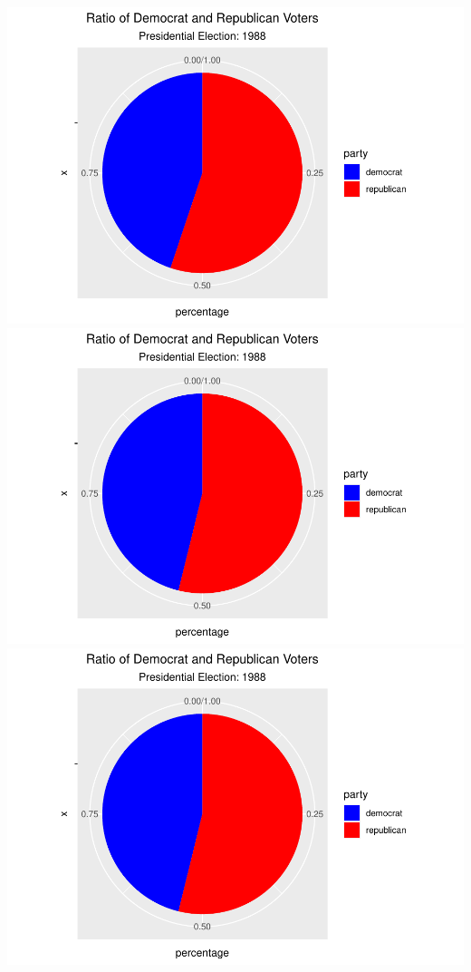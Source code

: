 \documentclass[
]{article}
\begin{document}
\includegraphics{election_files/figure-latex/anim-28.pdf}
\includegraphics{election_files/figure-latex/anim-29.pdf}
\includegraphics{election_files/figure-latex/anim-30.pdf}
\end{document}
